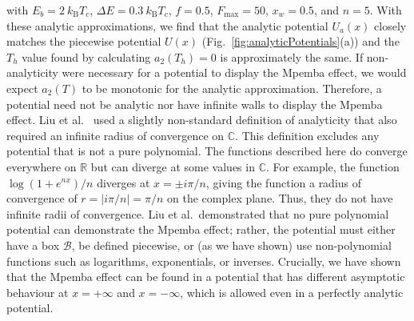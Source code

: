 \documentclass[hyperref={colorlinks=true, urlcolor=blue, citecolor=blue, final, bound}]{sfuthesis}
\newcommand{\kB}{k_{\mathrm{B}}}
\begin{document}
with $E_b=2~\kB T_c$, $\Delta E=0.3~\kB T_c$, $f=0.5$, $F_{\max}=50$, $x_w=0.5$, and $n=5$. With these analytic approximations, we find that the analytic potential $U_a(x)$ closely matches the piecewise potential $U(x)$ (Fig.~\ref{fig:analyticPotentials}(a)) and the $T_h$ value found by calculating $a_2(T_h)=0$ is approximately the same. If non-analyticity were necessary for a potential to display the Mpemba effect, we would expect $a_2(T)$ to be monotonic for the analytic approximation. Therefore, a potential need not be analytic nor have infinite walls to display the Mpemba effect. Liu et al.~\cite{Liu2026} used a slightly non-standard definition of analyticity that also required an infinite radius of convergence on $\mathbb C$. This definition excludes any potential that is not a pure polynomial. The functions described here do converge everywhere on $\mathbb R$ but can diverge at some values in $\mathbb C$. For example, the function $\log(1+e^{nx})/n$ diverges at $x=\pm i\pi/n$, giving the function a radius of convergence of $r=|i\pi/n|=\pi/n$ on the complex plane. Thus, they do not have infinite radii of convergence. Liu et al.\ demonstrated that no pure polynomial potential can demonstrate the Mpemba effect; rather, the potential must either have a box $\mathcal B$, be defined piecewise, or (as we have shown) use non-polynomial functions such as logarithms, exponentials, or inverses. Crucially, we have shown that the Mpemba effect can be found in a potential that has different asymptotic behaviour at $x=+\infty$ and $x=-\infty$, which is allowed even in a perfectly analytic potential.

\end{document}
